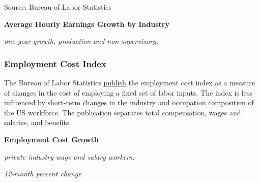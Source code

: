 \documentclass{report}
\makeatletter
\newcommand{\tbllink}[1]{\href{https://raw.githubusercontent.com/bdecon/US-chartbook/master/chartbook/data/#1}{\faTable}}
\newcommand*\short[1]{\expandafter\@gobbletwo\number\numexpr#1\relax}
\newcommand{\stdnode}[3]{\node[below, align=left, shift=({#1,#2})]{#3};}
\newcommand{\dateaxisticks}{
		date coordinates in=x, axis line style={draw=none},
		xmax={2020-10-01},
		max space between ticks=40,	    
		xtick={{1990-01-01}, {1992-01-01}, {1994-01-01}, 
			{1996-01-01}, {1998-01-01}, {2000-01-01}, 
			{2002-01-01}, {2004-01-01}, {2006-01-01},
			{2008-01-01}, {2010-01-01}, {2012-01-01}, {2014-01-01},
		    {2016-01-01}, {2018-01-01}, {2020-01-01}},
		minor xtick={{1989-01-01}, {1991-01-01}, {1993-01-01},
			{1995-01-01}, {1997-01-01}, {1999-01-01}, 
			{2001-01-01}, {2003-01-01}, {2005-01-01}, {2007-01-01},
		    {2009-01-01}, {2011-01-01}, {2013-01-01}, {2015-01-01},
		    {2017-01-01}, {2019-01-01}},
		enlarge y limits={0.06}, enlarge x limits={0.01},
		}
\newcommand{\bbar}[2]{extra #1 ticks = {{#2}}, extra #1 tick labels = ,
		extra #1 tick style = {grid=major, grid style={thick, black!25}},}
\newcommand{\stdline}[4]{\addplot[very thick, no markers, color=#1] 
		table [x=#2, y=#3, col sep=comma] {#4};	}
\newcommand{\rebars}{
		\fill[color=black!10] (axis cs:{2007-12-01},\pgfkeysvalueof{/pgfplots/ymin}) rectangle 
			(axis cs:{2009-07-01}, \pgfkeysvalueof{/pgfplots/ymax});
		\fill[color=black!10] (axis cs:{2001-03-01},\pgfkeysvalueof{/pgfplots/ymin}) rectangle 
			(axis cs:{2001-11-01}, \pgfkeysvalueof{/pgfplots/ymax});
		\fill[color=black!10] (axis cs:{2020-02-01},\pgfkeysvalueof{/pgfplots/ymin}) rectangle 
			(axis cs:{2020-10-01}, \pgfkeysvalueof{/pgfplots/ymax});}
\makeatother
\begin{document}
{{{{{{{{{\begin{minipage}{0.76\textwidth}
\footnotesize{Source: Bureau of Labor Statistics} \hfill \tbllink{ahe.csv}

\vspace{5mm}

\small  

\vspace{5mm}

\normalsize \textbf{Average Hourly Earnings Growth by Industry}

\footnotesize{\textit{one-year growth, production and non-supervisory, }}


\end{minipage}
\newpage
\subsubsection*{\color{black!70} \seriffont Employment Cost Index}
\begin{minipage}{0.76\textwidth}
\small The Bureau of Labor Statistics \href{https://www.bls.gov/news.release/eci.nr0.htm}{publish} the employment cost index as a measure of changes in the cost of employing a fixed set of labor inputs. The index is less influenced by short-term changes in the industry and occupation composition of the US workforce. The publication separates total compensation, wages and salaries, and benefits.

\end{minipage}

\vspace{2mm}

\begin{minipage}{0.44\textwidth}

\normalsize \textbf{Employment Cost Growth}

\footnotesize{\textit{private industry wage and salary workers,}}

\footnotesize{\textit{12-month percent change}}

\hspace*{-2mm} 


\end{minipage}}}}}}}}}}
\end{document}
